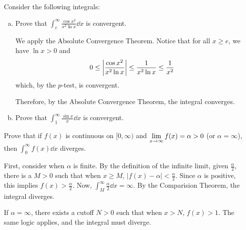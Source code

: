 \documentclass{agony}
\begin{document}
\begin{prob}
  Consider the following integrals:
\end{prob}
\begin{enumerate}[(a)]
  \item Prove that $\int_e^\infty \frac{\cos x^2}{x^2 \ln x} \dd{x}$ is convergent.
        \begin{prf}
          We apply the Absolute Convergence Theorem.
          Notice that for all $x \geq e$, we have $\ln x > 0$ and
          \[
            0 \leq \abs{\frac{\cos x^2}{x^2 \ln x}}
            \leq \frac{1}{x^2 \ln x}
            \leq \frac{1}{x^2}
          \]
          which, by the $p$-test, is convergent.

          Therefore, by the Absolute Convergence Theorem, the integral converges.
        \end{prf}
  \item Prove that $\int_1^\infty \frac{\sin x}{x} \dd{x}$ is convergent.
\end{enumerate}

\begin{prob}
  Prove that if $f(x)$ is continuous on $[0,\infty)$
  and $\lim\limits_{x\to\infty} f(x) = \alpha > 0$ (or $\alpha = \infty$),
  then $\int_0^\infty f(x) \dd{x}$ diverges.
\end{prob}
\begin{prf}
  First, consider when $\alpha$ is finite.
  By the definition of the infinite limit, given $\frac\alpha2$,
  there is a $M > 0$ such that when $x \geq M$, $|f(x) - \alpha| < \frac\alpha2$.
  Since $\alpha$ is positive, this implies $f(x) > \frac\alpha2$.
  Now, $\int_M^\infty \frac\alpha2 \dd{x} = \infty$.
  By the Comparision Theorem, the integral diverges.

  If $\alpha = \infty$, there exists a cutoff $N > 0$ such that when $x > N$, $f(x) > 1$.
  The same logic applies, and the integral must diverge.
\end{prf}
\end{document}
